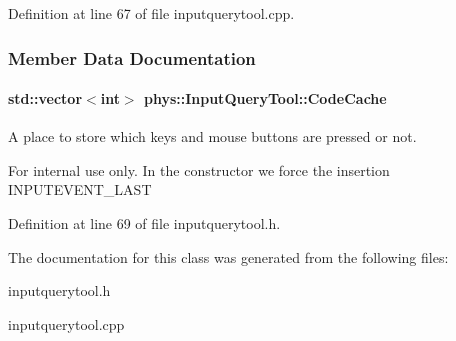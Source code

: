Definition at line 67 of file inputquerytool.cpp.



\subsubsection{Member Data Documentation}
\hypertarget{classphys_1_1InputQueryTool_ae4ca82bd8afc87c2f07cef779449c60b}{
\paragraph[{CodeCache}]{\setlength{\rightskip}{0pt plus 5cm}std::vector$<$int$>$ {\bf phys::InputQueryTool::CodeCache}}\hfill}
\label{da/d96/classphys_1_1InputQueryTool_ae4ca82bd8afc87c2f07cef779449c60b}


A place to store which keys and mouse buttons are pressed or not. 

\begin{DoxyInternal}{For internal use only.}
In the constructor we force the insertion INPUTEVENT\_\-LAST \end{DoxyInternal}


Definition at line 69 of file inputquerytool.h.



The documentation for this class was generated from the following files:\begin{DoxyCompactItemize}
\item 
inputquerytool.h\item 
inputquerytool.cpp\end{DoxyCompactItemize}

